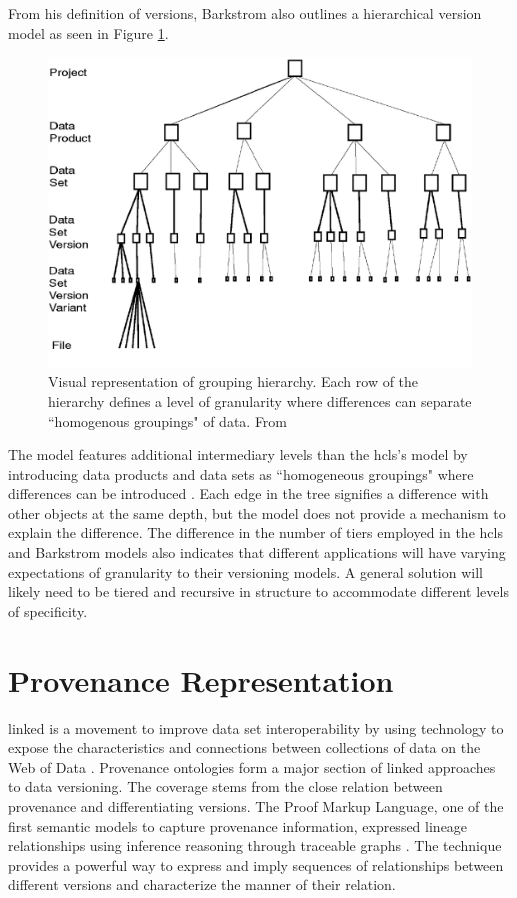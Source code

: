 From his definition of versions, Barkstrom also outlines a hierarchical version model as seen in Figure \ref{hierarchy}.
\begin{figure}
	\centering
	\includegraphics[scale=0.50]{figures/hierarchy.png}
	\caption[Visual representation of grouping hierarchy.]{Visual representation of grouping hierarchy.  Each row of the hierarchy defines a level of granularity where differences can separate ``homogenous groupings" of data.  From \cite{Barkstrom2003}}
	\label{hierarchy}
\end{figure}
The model features additional intermediary levels than the \gls{hcls}'s model by introducing data products and data sets as ``homogeneous groupings" where differences can be introduced \cite{barkstrom2014earth}.
Each edge in the tree signifies a difference with other objects at the same depth, but the model does not provide a mechanism to explain the difference.
The difference in the number of tiers employed in the \gls{hcls} and Barkstrom models also indicates that different applications will have varying expectations of granularity to their versioning models.
A general solution will likely need to be tiered and recursive in structure to accommodate different levels of specificity.

\section{Provenance Representation} \label{sec:provmod}

\Gls{linked} is a movement to improve data set interoperability by using technology to expose the characteristics and connections between collections of data on the Web of Data \cite{ld}.
Provenance ontologies form a major section of \gls{linked} approaches to data versioning.
The coverage stems from the close relation between provenance and differentiating versions.
The Proof Markup Language, one of the first semantic models to capture provenance information, expressed lineage relationships using inference reasoning through traceable graphs \cite{daSilva2006381}.
The technique provides a powerful way to express and imply sequences of relationships between different versions and characterize the manner of their relation.

